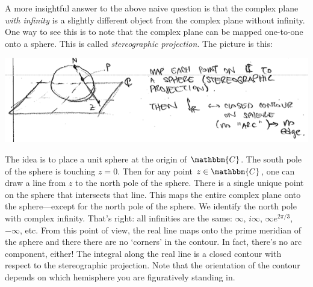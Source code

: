 A more insightful answer to the above naive question is that the complex plane \emph{with infinity} is a slightly different object from the complex plane without infinity. One way to see this is to note that the complex plane can be mapped one-to-one onto a sphere. This is called \emph{stereographic projection}. The picture is this:
\begin{center}
\includegraphics[width=.9\textwidth]{figures/Lec_2017_stereographic.png}
\end{center}
The idea is to place a unit sphere at the origin of $\mathbbm{C}$. The south pole of the sphere is touching $z=0$. Then for any point $z\in\mathbbm{C}$, one can draw a line from $z$ to the north pole of the sphere. There is a single unique point on the sphere that intersects that line. This maps the entire complex plane onto the sphere---except for the north pole of the sphere. We identify the north pole with complex infinity. That's right: all infinities are the same: $\infty$, $i\infty$, $\infty e^{2\pi/3}$, $-\infty$, etc. From this point of view, the real line maps onto the prime meridian of the sphere and there there are no `corners' in the contour. In fact, there's no arc component, either! The integral along the real line is a closed contour with respect to the stereographic projection. Note that the orientation of the contour depends on which hemisphere you are figuratively standing in.



